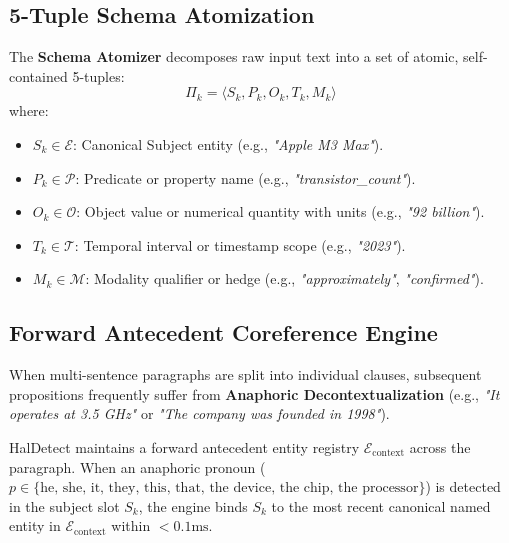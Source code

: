 \subsection{5-Tuple Schema Atomization}
The \textbf{Schema Atomizer} decomposes raw input text into a set of atomic, self-contained 5-tuples:
\begin{equation}
    \Pi_k = \langle S_k, P_k, O_k, T_k, M_k \rangle
\end{equation}
where:
\begin{itemize}
    \item $S_k \in \mathcal{E}$: Canonical Subject entity (e.g., \textit{"Apple M3 Max"}).
    \item $P_k \in \mathcal{P}$: Predicate or property name (e.g., \textit{"transistor\_count"}).
    \item $O_k \in \mathcal{O}$: Object value or numerical quantity with units (e.g., \textit{"92 billion"}).
    \item $T_k \in \mathcal{T}$: Temporal interval or timestamp scope (e.g., \textit{"2023"}).
    \item $M_k \in \mathcal{M}$: Modality qualifier or hedge (e.g., \textit{"approximately"}, \textit{"confirmed"}).
\end{itemize}

\subsection{Forward Antecedent Coreference Engine}
When multi-sentence paragraphs are split into individual clauses, subsequent propositions frequently suffer from \textbf{Anaphoric Decontextualization} (e.g., \textit{"It operates at 3.5 GHz"} or \textit{"The company was founded in 1998"}). 

HalDetect maintains a forward antecedent entity registry $\mathcal{E}_{\text{context}}$ across the paragraph. When an anaphoric pronoun ($p \in \{\text{he, she, it, they, this, that, the device, the chip, the processor}\}$) is detected in the subject slot $S_k$, the engine binds $S_k$ to the most recent canonical named entity in $\mathcal{E}_{\text{context}}$ within $< 0.1\text{ms}$.


